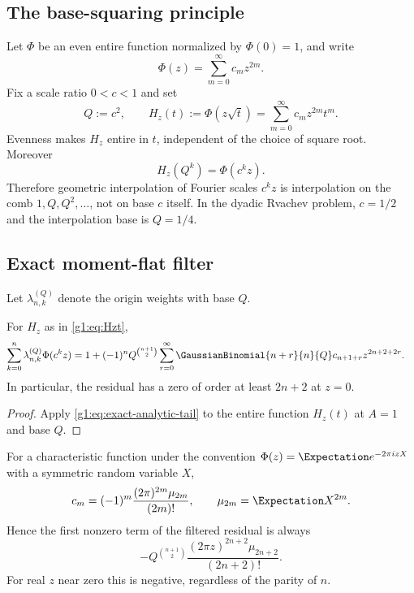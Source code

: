 \subsection{The base-squaring principle}

Let $\Phi$ be an even entire function normalized by $\Phi(0)=1$, and write
\begin{equation}
 \Phi(z)=\sum_{m=0}^{\infty}c_mz^{2m}.
 \label{g1:eq:Phi-even}
\end{equation}
Fix a scale ratio $0<c<1$ and set
\begin{equation}
 Q:=c^2,\qquad H_z(t):=\Phi(z\sqrt t)
 =\sum_{m=0}^{\infty}c_mz^{2m}t^m.
 \label{g1:eq:Hzt}
\end{equation}
Evenness makes $H_z$ entire in $t$, independent of the choice of square root.
Moreover
\begin{equation}
 H_z(Q^k)=\Phi(c^kz).
 \label{g1:eq:scale-samples}
\end{equation}
Therefore geometric interpolation of Fourier scales $c^kz$ is interpolation on
the comb $1,Q,Q^2,\ldots$, not on base $c$ itself.  In the dyadic Rvachev
problem, $c=1/2$ and the interpolation base is $Q=1/4$.

\subsection{Exact moment-flat filter}

Let $\lambda_{n,k}^{(Q)}$ denote the origin weights with base $Q$.

\begin{theorem}
For $H_z$ as in \eqref{g1:eq:Hzt},
\begin{align}
 \sum_{k=0}^n\lambda_{n,k}^{(Q)}\Phi(c^kz)
 &=1+(-1)^nQ^{\binom{n+1}{2}}
 \sum_{r=0}^{\infty}\GaussianBinomial{n+r}{n}{Q}
 c_{n+1+r}z^{2n+2+2r}.
 \label{g1:eq:even-entire-filter}
\end{align}
In particular, the residual has a zero of order at least $2n+2$ at $z=0$.
\end{theorem}

\begin{proof}
Apply \eqref{g1:eq:exact-analytic-tail} to the entire function $H_z(t)$ at
$A=1$ and base $Q$.
\end{proof}

For a characteristic function under the convention
$\Phi(z)=\Expectation e^{-2\pi izX}$ with a symmetric random variable $X$,
\begin{equation}
 c_m=(-1)^m\frac{(2\pi)^{2m}\mu_{2m}}{(2m)!},
 \qquad \mu_{2m}=\Expectation X^{2m}.
 \label{g1:eq:Fourier-coeff-moments}
\end{equation}
Hence the first nonzero term of the filtered residual is always
\begin{equation}
 -Q^{\binom{n+1}{2}}
 \frac{(2\pi z)^{2n+2}\mu_{2n+2}}{(2n+2)!}.
 \label{g1:eq:leading-Fourier-residual}
\end{equation}
For real $z$ near zero this is negative, regardless of the parity of $n$.

